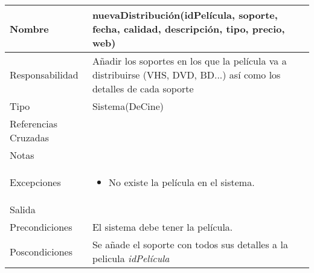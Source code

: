 \documentclass{article}
\begin{document}
\begin{table}[h]
\begin{tabular}{|l|l|l|l|l|l|}
\hline
\multicolumn{2}{|p{3cm}|}{Nombre} & \multicolumn{4}{p{10cm}|}{\textbf{nuevaDistribución(idPelícula, soporte, fecha, calidad, descripción, tipo, precio, web)}}\\
\hline
\multicolumn{2}{|p{3cm}|}{Responsabilidad} & \multicolumn{4}{p{10cm}|}{Añadir los soportes en los que la película va a distribuirse (VHS, DVD, BD...) así como los detalles de cada soporte} \\
\hline
\multicolumn{2}{|p{3cm}|}{Tipo} & \multicolumn{4}{p{10cm}|}{Sistema(DeCine)} \\
\hline
\multicolumn{2}{|p{3cm}|}{Referencias Cruzadas} & \multicolumn{4}{p{10cm}|}{} \\
\hline
\multicolumn{2}{|p{3cm}|}{Notas} & \multicolumn{4}{p{10cm}|}{} \\
\hline
\multicolumn{2}{|p{3cm}|}{Excepciones} & \multicolumn{4}{p{10cm}|}{\begin{itemize}
\item No existe la película en el sistema.
\end{itemize}} \\
\hline
\multicolumn{2}{|p{3cm}|}{Salida} & \multicolumn{4}{p{10cm}|}{} \\
\hline
\multicolumn{2}{|p{3cm}|}{Precondiciones} & \multicolumn{4}{p{10cm}|}{El sistema debe tener la película.} \\
\hline
\multicolumn{2}{|p{3cm}|}{Poscondiciones} & \multicolumn{4}{p{10cm}|}{Se añade el soporte con todos sus detalles a la pelicula \textit{idPelícula}} \\
\hline
\end{tabular}
\end{table}
\end{document}
